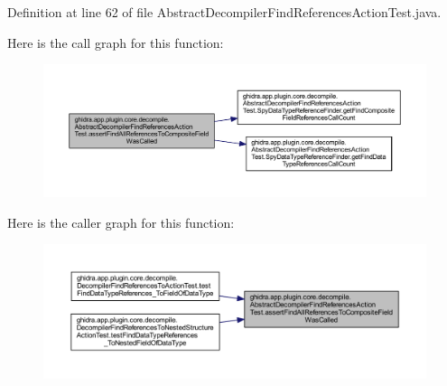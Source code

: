 Definition at line 62 of file Abstract\+Decompiler\+Find\+References\+Action\+Test.\+java.

Here is the call graph for this function\+:
\nopagebreak
\begin{figure}[H]
\begin{center}
\leavevmode
\includegraphics[width=350pt]{classghidra_1_1app_1_1plugin_1_1core_1_1decompile_1_1_abstract_decompiler_find_references_action_test_ab9649213e2f76913f52fcbb9bf2c602b_cgraph}
\end{center}
\end{figure}
Here is the caller graph for this function\+:
\nopagebreak
\begin{figure}[H]
\begin{center}
\leavevmode
\includegraphics[width=350pt]{classghidra_1_1app_1_1plugin_1_1core_1_1decompile_1_1_abstract_decompiler_find_references_action_test_ab9649213e2f76913f52fcbb9bf2c602b_icgraph}
\end{center}
\end{figure}
\mbox{\label{classghidra_1_1app_1_1plugin_1_1core_1_1decompile_1_1_abstract_decompiler_find_references_action_test_aedb707fa1d0bc095ddb1545409c14e1c}} 
